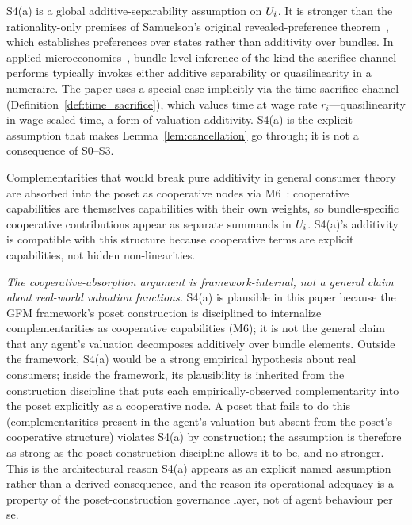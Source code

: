 \begin{remark}
\label{rem:s4a_status}
S4(a) is a global additive-separability assumption on $U_i$.
It is stronger than the rationality-only premises of Samuelson's
original revealed-preference
theorem~\citep{samuelson1938note}, which establishes preferences
over states rather than additivity over bundles.  In applied
microeconomics~\citep{mascolell1995microeconomic}, bundle-level
inference of the kind the sacrifice channel performs typically
invokes either additive separability or quasilinearity in a
numeraire.  The paper uses a special case implicitly via the
time-sacrifice channel (Definition~\ref{def:time_sacrifice}),
which values time at wage rate $r_i$---quasilinearity in
wage-scaled time, a form of valuation additivity.  S4(a) is the
explicit assumption that makes Lemma~\ref{lem:cancellation} go
through; it is not a consequence of S0--S3.

Complementarities that would break pure additivity in general
consumer theory are absorbed into the poset as cooperative
nodes via M6~\citep[Proposition~1]{lasser2026poset}: cooperative
capabilities are themselves capabilities with their own weights,
so bundle-specific cooperative contributions appear as separate
summands in $U_i$.  S4(a)'s additivity is compatible with this
structure because cooperative terms are explicit capabilities,
not hidden non-linearities.

\emph{The cooperative-absorption argument is framework-internal,
not a general claim about real-world valuation functions.}  S4(a)
is plausible in this paper because the GFM framework's poset
construction is disciplined to internalize complementarities as
cooperative capabilities (M6); it is not the general claim that
any agent's valuation decomposes additively over bundle elements.
Outside the framework, S4(a) would be a strong empirical
hypothesis about real consumers; inside the framework, its
plausibility is inherited from the construction discipline that
puts each empirically-observed complementarity into the poset
explicitly as a cooperative node.  A poset that fails to do this
(complementarities present in the agent's valuation but absent
from the poset's cooperative structure) violates S4(a) by
construction; the assumption is therefore as strong as the
poset-construction discipline allows it to be, and no stronger.
This is the architectural reason S4(a) appears as an explicit
named assumption rather than a derived consequence, and the
reason its operational adequacy is a property of the
poset-construction governance layer, not of agent behaviour
per se.
\end{remark}

